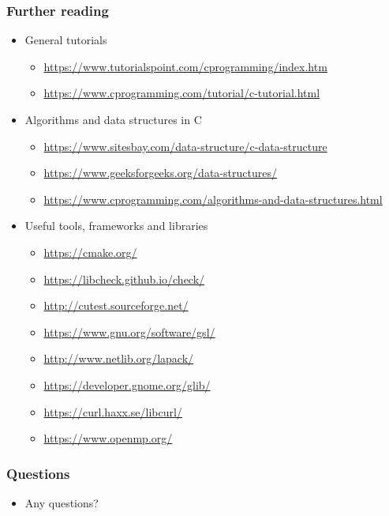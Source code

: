 \documentclass{beamer}
\begin{document}
\begin{frame}
    \frametitle{Further reading}
    \begin{itemize}
        \item General tutorials
            \begin{itemize}
                \item \url{https://www.tutorialspoint.com/cprogramming/index.htm}
                \item \url{https://www.cprogramming.com/tutorial/c-tutorial.html}
            \end{itemize}
        \item Algorithms and data structures in C
            \begin{itemize}
                \item \url{https://www.sitesbay.com/data-structure/c-data-structure}
                \item \url{https://www.geeksforgeeks.org/data-structures/}
                \item \url{https://www.cprogramming.com/algorithms-and-data-structures.html}
            \end{itemize}
        \item Useful tools, frameworks and libraries
            \begin{itemize}
                \item \url{https://cmake.org/}
                \item \url{https://libcheck.github.io/check/}
                \item \url{http://cutest.sourceforge.net/}
                \item \url{https://www.gnu.org/software/gsl/}
                \item \url{http://www.netlib.org/lapack/}
                \item \url{https://developer.gnome.org/glib/}
                \item \url{https://curl.haxx.se/libcurl/}
                \item \url{https://www.openmp.org/}
            \end{itemize}
    \end{itemize}
\end{frame}

\begin{frame}
    \frametitle{Questions}
    \begin{itemize}
        \item Any questions?
    \end{itemize}
\end{frame}
\end{document}
